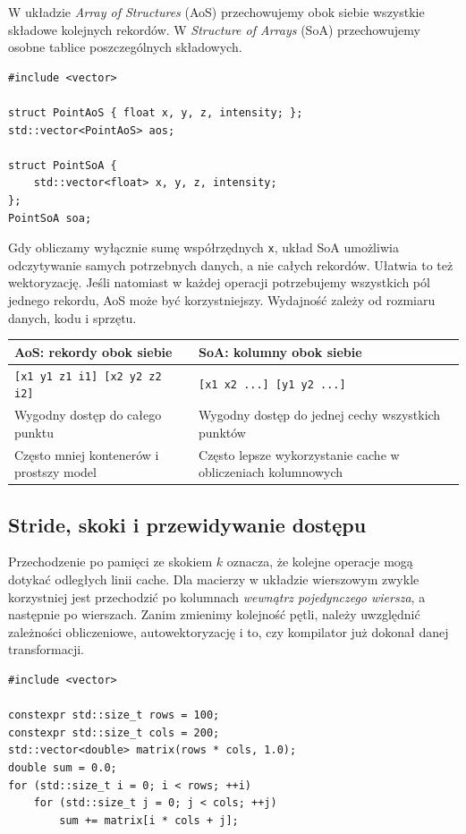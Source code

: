 W układzie \emph{Array of Structures} (AoS) przechowujemy obok siebie
wszystkie składowe kolejnych rekordów. W \emph{Structure of Arrays}
(SoA) przechowujemy osobne tablice poszczególnych składowych.

\begin{lstlisting}
#include <vector>

struct PointAoS { float x, y, z, intensity; };
std::vector<PointAoS> aos;

struct PointSoA {
    std::vector<float> x, y, z, intensity;
};
PointSoA soa;
\end{lstlisting}

Gdy obliczamy wyłącznie sumę współrzędnych \texttt{x}, układ SoA
umożliwia odczytywanie samych potrzebnych danych, a nie całych
rekordów. Ułatwia to też wektoryzację. Jeśli natomiast w każdej
operacji potrzebujemy wszystkich pól jednego rekordu, AoS może być
korzystniejszy. Wydajność zależy od rozmiaru danych, kodu i sprzętu.

\begin{center}
\small
\begin{tabular}{|p{6.0cm}|p{6.0cm}|}
\hline
\textbf{AoS: rekordy obok siebie} & \textbf{SoA: kolumny obok siebie} \\
\hline
\texttt{[x1 y1 z1 i1] [x2 y2 z2 i2]} &
\texttt{[x1 x2 ...] [y1 y2 ...]} \\
\hline
Wygodny dostęp do całego punktu & Wygodny dostęp do jednej cechy wszystkich punktów \\
\hline
Często mniej kontenerów i prostszy model & Często lepsze wykorzystanie cache w obliczeniach kolumnowych \\
\hline
\end{tabular}
\end{center}

\subsection{Stride, skoki i przewidywanie dostępu}

Przechodzenie po pamięci ze skokiem \(k\) oznacza, że kolejne
operacje mogą dotykać odległych linii cache. Dla macierzy w układzie
wierszowym zwykle korzystniej jest przechodzić po kolumnach
\emph{wewnątrz pojedynczego wiersza}, a następnie po wierszach.
Zanim zmienimy kolejność pętli, należy uwzględnić zależności
obliczeniowe, autowektoryzację i to, czy kompilator już dokonał
danej transformacji.

\begin{lstlisting}
#include <vector>

constexpr std::size_t rows = 100;
constexpr std::size_t cols = 200;
std::vector<double> matrix(rows * cols, 1.0);
double sum = 0.0;
for (std::size_t i = 0; i < rows; ++i)
    for (std::size_t j = 0; j < cols; ++j)
        sum += matrix[i * cols + j];
\end{lstlisting}

